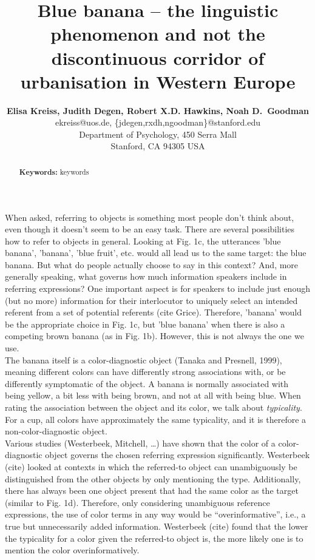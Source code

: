 \documentclass[10pt,letterpaper]{article}
\title{Blue banana -- the linguistic phenomenon and not the discontinuous corridor of urbanisation in Western Europe}
\author{{\large \bf Elisa Kreiss, Judith Degen, Robert X.D. Hawkins, Noah D.~Goodman} \\
  ekreiss@uos.de, \{jdegen,rxdh,ngoodman\}@stanford.edu\\
  Department of Psychology, 450 Serra Mall \\
  Stanford, CA 94305 USA}
\begin{document}
\maketitle


\begin{abstract}


\textbf{Keywords:} 
keywords
\end{abstract}


When asked, referring to objects is something most people don't think about, even though it doesn't seem to be an easy task. There are several possibilities how to refer to objects in general. Looking at Fig. 1c, the utterances 'blue banana', 'banana', 'blue fruit', etc. would all lead us to the same target: the blue banana. But what do people actually choose to say in this context? And, more generally speaking, what governs how much information speakers include in referring expressions? One important aspect is for speakers to include just enough (but no more) information for their interlocutor to uniquely select an intended referent from a set of potential referents (cite Grice). Therefore, 'banana' would be the appropriate choice in Fig. 1c, but 'blue banana' when there is also a competing brown banana (as in Fig. 1b). However, this is not always the one we use.\\
The banana itself is a color-diagnostic object (Tanaka and Presnell, 1999), meaning different colors can have differently strong associations with, or be differently symptomatic of the object. A banana is normally associated with being yellow, a bit less with being brown, and not at all with being blue. When rating the association between the object and its color, we talk about \textit{typicality}. For a cup, all colors have approximately the same typicality, and it is therefore a non-color-diagnostic object.\\
Various studies (Westerbeek, Mitchell, …) have shown that the color of a color-diagnostic object governs the chosen referring expression significantly. Westerbeek (cite) looked at contexts in which the referred-to object can unambiguously be distinguished from the other objects by only mentioning the type. Additionally, there has always been one object present that had the same color as the target (similar to Fig. 1d). Therefore, only considering unambiguous reference expressions, the use of color terms in any way would be “overinformative”, i.e., a true but unnecessarily added information. Westerbeek (cite) found that the lower the typicality for a color given the referred-to object is, the more likely one is to mention the color overinformatively.\\
\end{document}
